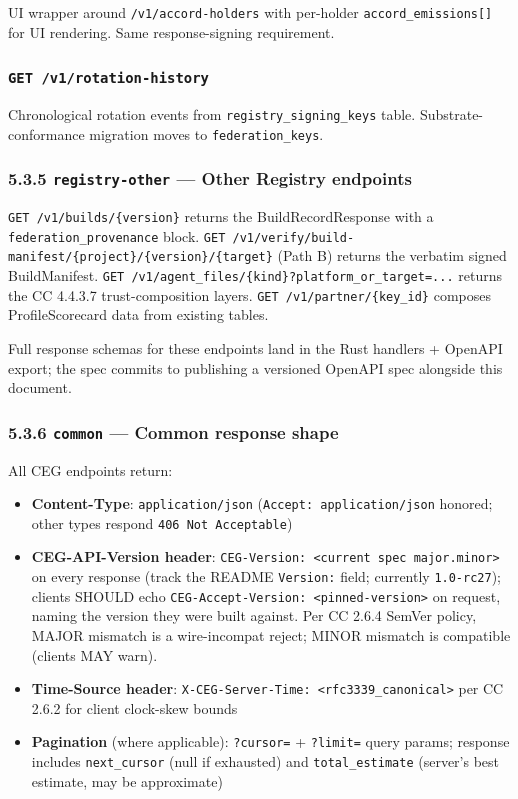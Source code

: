 \documentclass[11pt]{article}
\begin{document}
UI wrapper around \texttt{/v1/accord-holders} with per-holder \texttt{accord\_emissions[]} for UI rendering. Same response-signing requirement.


\subsubsection*{\texttt{GET /v1/rotation-history}}


Chronological rotation events from \texttt{registry\_signing\_keys} table. Substrate-conformance migration moves to \texttt{federation\_keys}.


\subsubsection*{5.3.5 \texttt{registry-other} — Other Registry endpoints}


\texttt{GET /v1/builds/\{version\}} returns the BuildRecordResponse with a \texttt{federation\_provenance} block. \texttt{GET /v1/verify/build-manifest/\{project\}/\{version\}/\{target\}} (Path B) returns the verbatim signed BuildManifest. \texttt{GET /v1/agent\_files/\{kind\}?platform\_or\_target=...} returns the CC 4.4.3.7 trust-composition layers. \texttt{GET /v1/partner/\{key\_id\}} composes ProfileScorecard data from existing tables.


Full response schemas for these endpoints land in the Rust handlers + OpenAPI export; the spec commits to publishing a versioned OpenAPI spec alongside this document.


\subsubsection*{5.3.6 \texttt{common} — Common response shape}


All CEG endpoints return:


\begin{itemize}\setlength\itemsep{0pt}
\item \textbf{Content-Type}: \texttt{application/json} (\texttt{Accept: application/json} honored; other types respond \texttt{406 Not Acceptable})
\item \textbf{CEG-API-Version header}: \texttt{CEG-Version: <current spec major.minor>} on every response (track the README \texttt{Version:} field; currently \texttt{1.0-rc27}); clients SHOULD echo \texttt{CEG-Accept-Version: <pinned-version>} on request, naming the version they were built against. Per CC 2.6.4 SemVer policy, MAJOR mismatch is a wire-incompat reject; MINOR mismatch is compatible (clients MAY warn).
\item \textbf{Time-Source header}: \texttt{X-CEG-Server-Time: <rfc3339\_canonical>} per CC 2.6.2 for client clock-skew bounds
\item \textbf{Pagination} (where applicable): \texttt{?cursor=} + \texttt{?limit=} query params; response includes \texttt{next\_cursor} (null if exhausted) and \texttt{total\_estimate} (server's best estimate, may be approximate)
\end{itemize}
\end{document}
